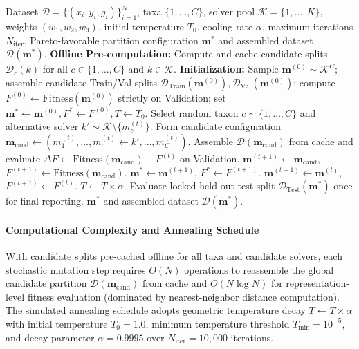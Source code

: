 \documentclass[a4paper,fleqn]{cas-sc}
\begin{document}
\begin{algorithm}[pos=htbp]
\caption{Combinatorial Simulated Annealing Meta-Selector (CEGS-Split)}
\label{alg:cegs_split}
\begin{algorithmic}[1]
\Require Dataset $\mathcal{D} = \{(x_i, y_i, g_i)\}_{i=1}^N$, taxa $\{1,\dots,C\}$, solver pool $\mathcal{K}=\{1,\dots,K\}$, weights $(w_1, w_2, w_3)$, initial temperature $T_0$, cooling rate $\alpha$, maximum iterations $N_{\text{iter}}$.
\Ensure Pareto-favorable partition configuration $\boldsymbol{m}^*$ and assembled dataset $\mathcal{D}(\boldsymbol{m}^*)$.
\State \textbf{Offline Pre-computation:} Compute and cache candidate splits $\mathcal{D}_c(k)$ for all $c \in \{1,\dots,C\}$ and $k \in \mathcal{K}$.
\State \textbf{Initialization:} Sample $\boldsymbol{m}^{(0)} \sim \mathcal{K}^C$; assemble candidate Train/Val splits $\mathcal{D}_{\text{Train}}(\boldsymbol{m}^{(0)}), \mathcal{D}_{\text{Val}}(\boldsymbol{m}^{(0)})$; compute $F^{(0)} \gets \mathrm{Fitness}(\boldsymbol{m}^{(0)})$ strictly on Validation; set $\boldsymbol{m}^* \gets \boldsymbol{m}^{(0)}, F^* \gets F^{(0)}, T \gets T_0$.
    \State Select random taxon $c \sim \{1, \dots, C\}$ and alternative solver $k' \sim \mathcal{K} \setminus \{m_c^{(t)}\}$.
    \State Form candidate configuration $\boldsymbol{m}_{\text{cand}} \gets (m_1^{(t)}, \dots, m_c^{(t)} \gets k', \dots, m_C^{(t)})$.
    \State Assemble $\mathcal{D}(\boldsymbol{m}_{\text{cand}})$ from cache and evaluate $\Delta F \gets \mathrm{Fitness}(\boldsymbol{m}_{\text{cand}}) - F^{(t)}$ on Validation.
        \State $\boldsymbol{m}^{(t+1)} \gets \boldsymbol{m}_{\text{cand}}$, $F^{(t+1)} \gets \mathrm{Fitness}(\boldsymbol{m}_{\text{cand}})$.
            \State $\boldsymbol{m}^* \gets \boldsymbol{m}^{(t+1)}$, $F^* \gets F^{(t+1)}$.
        \EndIf
    \Else
        \State $\boldsymbol{m}^{(t+1)} \gets \boldsymbol{m}^{(t)}$, $F^{(t+1)} \gets F^{(t)}$.
    \EndIf
    \State $T \gets T \times \alpha$.
\EndFor
\State Evaluate locked held-out test split $\mathcal{D}_{\text{Test}}(\boldsymbol{m}^*)$ once for final reporting.
\State \Return $\boldsymbol{m}^*$ and assembled dataset $\mathcal{D}(\boldsymbol{m}^*)$.
\end{algorithmic}
\end{algorithm}

\paragraph{Computational Complexity and Annealing Schedule}
With candidate splits pre-cached offline for all taxa and candidate solvers, each stochastic mutation step requires $O(N)$ operations to reassemble the global candidate partition $\mathcal{D}(\boldsymbol{m}_{\text{cand}})$ from cache and $O(N \log N)$ for representation-level fitness evaluation (dominated by nearest-neighbor distance computation). The simulated annealing schedule adopts geometric temperature decay $T \gets T \times \alpha$ with initial temperature $T_0 = 1.0$, minimum temperature threshold $T_{\min} = 10^{-5}$, and decay parameter $\alpha = 0.9995$ over $N_{\text{iter}} = 10{,}000$ iterations.
\end{document}
